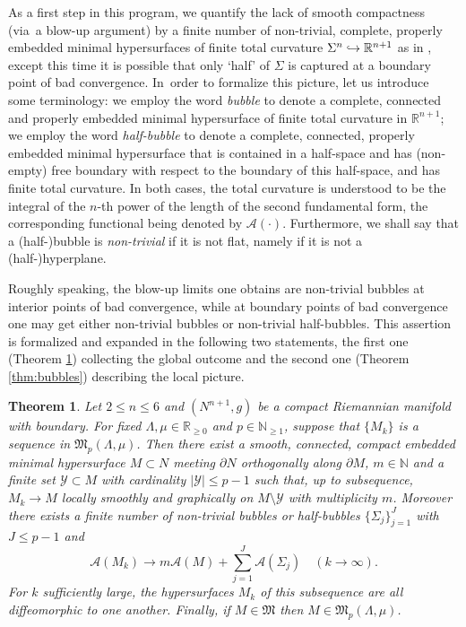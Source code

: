 \documentclass[10pt]{amsart}
\let\mathcal\mathscr
\newcounter{cas}
\newcommand{\hto}{\mathrel{\lhook\joinrel\to}}
\newtheorem{thm}{Theorem}
\theoremstyle{definition}
\newcommand{\R}{\mathbb{R}}
\newcommand{\N}{\mathbb{N}}
\let\emb\hto
\begin{document}
As a first step in this program, we quantify the lack of smooth compactness (via~a blow-up argument) by a finite number of non-trivial, complete, properly embedded minimal hypersurfaces of finite total curvature $\Sigma^n\emb \R^{n+1}$ as in \cite{BS17}, except this time it is possible that only `half' of $\Sigma$ is captured at a boundary point of bad convergence. In~order to formalize this picture, let us introduce some terminology:
we employ the word \emph{bubble} to denote a complete, connected and properly embedded minimal hypersurface of finite total curvature in $\R^{n+1}$; we employ the word \emph{half-bubble} to denote a complete, connected, properly embedded minimal hypersurface that is contained in a half-space and has (non-empty) free boundary with respect to the boundary of this half-space, and has finite total curvature. In both cases, the total curvature is understood to be the integral of the $n$-th power of the length of the second fundamental form, the corresponding functional being denoted by $\mathcal{A}(\cdot)$. Furthermore, we shall say that a (half-)bubble is \emph{non-trivial} if it is not flat, namely if it is not a (half-)hyperplane.

Roughly speaking, the blow-up limits one obtains are non-trivial bubbles at interior points of bad convergence, while at boundary points of bad convergence one may get either non-trivial bubbles or non-trivial half-bubbles. This assertion is formalized and expanded in the following two statements, the first one (Theorem \ref{thm:quant}) collecting the global outcome and the second one (Theorem \ref{thm:bubbles}) describing the local picture.


\begin{thm}\label{thm:quant}
Let $2\leq n\leq 6$ and $(N^{n+1},g)$ be a compact Riemannian manifold with boundary. For fixed $\Lambda, \mu\in \R_{\geq 0}$ and $p\in \N_{\geq 1}$, suppose that $\{M_k\}$ is a sequence in $\mathfrak{M}_p(\Lambda, \mu)$. Then there exist a smooth, connected, compact embedded minimal hypersurface $M\subset N$ meeting $\partial N$ orthogonally along $\partial M$, $m\in \mathbb{N}$ and a finite set $\mathcal{Y}\subset M$ with cardinality $|\mathcal{Y}|\leq p-1$ such that, up to subsequence, $M_k \to M$ locally smoothly and graphically on $M\setminus \mathcal{Y}$ with multiplicity $m$.
Moreover there exists a finite number of non-trivial bubbles or half-bubbles $\{\Sigma_j\}_{j=1}^J$ with $J\leq p-1$ and
\[
\mathcal{A}(M_k)\to m\mathcal{A}(M) + \sum_{j=1}^J \mathcal{A}(\Sigma_j) \quad (k\to\infty).
\]
For $k$ sufficiently large, the hypersurfaces $M_k$ of this subsequence are all diffeomorphic to one another. Finally, if $M\in\mathfrak{M}$ then $M\in\mathfrak{M}_{p}(\Lambda,\mu)$.
\end{thm}
\end{document}
